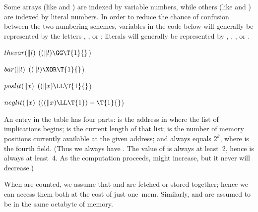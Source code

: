 Some arrays (like  and ) are indexed by variable
numbers,
while others (like  and ) are indexed by literal
numbers. In order
to reduce the chance of confusion between the two numbering schemes,
variables in the code below will generally be represented by the letters ,
, or ; literals will generally be represented by , , , or .

\Y\B\4\D$\\{thevar}(\|l)$ \5
$((\|l)\GG\T{1}{}$)\par
\B\4\D$\\{bar}(\|l)$ \5
$((\|l)\XOR\T{1}{}$)\par
\B\4\D$\\{poslit}(\|x)$ \5
$((\|x)\LL\T{1}{}$)\par
\B\4\D$\\{neglit}(\|x)$ \5
$(((\|x)\LL\T{1})+\T{1}{}$)\par
\fi

An entry in the  table has four parts:  is the
address in 
where the list of implications begins;  is the current length of
that list;  is the number of memory positions currently available
at the given address; and  always equals $2^k$, where  is
the fourth field. (Thus we always have . The value of
 is
always at least~2, hence  is always at least~4. As the
computation
proceeds,  might increase, but it never will decrease.)

When  are counted, we assume that  and 
are fetched or
stored together; hence we can access them both at the cost of just one~mem.
Similarly,  and  are assumed to be in the same octabyte
of memory.

